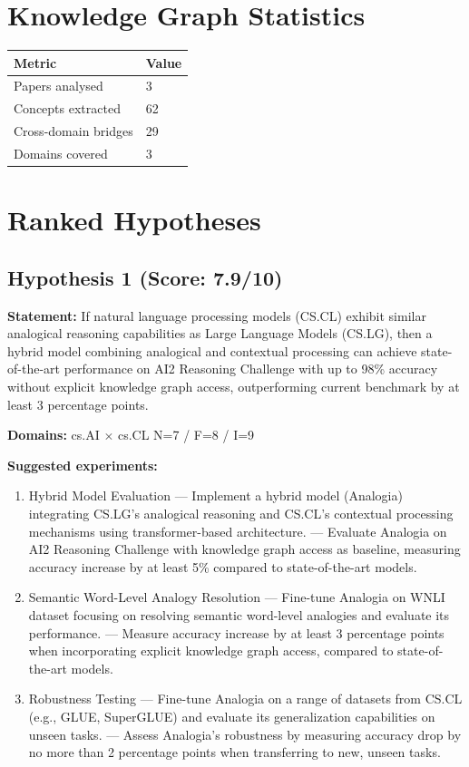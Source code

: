 \documentclass[12pt,a4paper]{article}
\begin{document}
\section{Knowledge Graph Statistics}

\begin{tabular}{ll}
\toprule
Metric & Value \\
\midrule
Papers analysed   & 3 \\
Concepts extracted & 62 \\
Cross-domain bridges & 29 \\
Domains covered   & 3 \\
\bottomrule
\end{tabular}

\section{Ranked Hypotheses}

\subsection*{Hypothesis 1 (Score: 7.9/10)}

\textbf{Statement:} If natural language processing models (CS.CL) exhibit similar analogical reasoning capabilities as Large Language Models (CS.LG), then a hybrid model combining analogical and contextual processing can achieve state-of-the-art performance on AI2 Reasoning Challenge with up to 98\% accuracy without explicit knowledge graph access, outperforming current benchmark by at least 3 percentage points.

\noindent\textbf{Domains:} cs.AI $\times$ cs.CL
\hspace{1em} N=7 / F=8 / I=9

\textbf{Suggested experiments:}
\begin{enumerate}
  \item Hybrid Model Evaluation — Implement a hybrid model (Analogia) integrating CS.LG's analogical reasoning and CS.CL's contextual processing mechanisms using transformer-based architecture. — Evaluate Analogia on AI2 Reasoning Challenge with knowledge graph access as baseline, measuring accuracy increase by at least 5\% compared to state-of-the-art models.
  \item Semantic Word-Level Analogy Resolution — Fine-tune Analogia on WNLI dataset focusing on resolving semantic word-level analogies and evaluate its performance. — Measure accuracy increase by at least 3 percentage points when incorporating explicit knowledge graph access, compared to state-of-the-art models.
  \item Robustness Testing — Fine-tune Analogia on a range of datasets from CS.CL (e.g., GLUE, SuperGLUE) and evaluate its generalization capabilities on unseen tasks. — Assess Analogia's robustness by measuring accuracy drop by no more than 2 percentage points when transferring to new, unseen tasks.
\end{enumerate}
\end{document}
